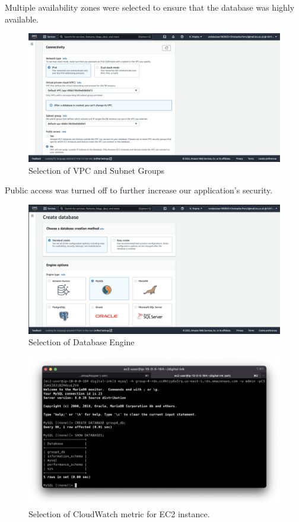 Multiple availability zones were selected to ensure that the database was highly available.

\begin{figure}
    \centering
    \includegraphics[width=\textwidth]{resources/rds/rds-connectivity-1.png}
    \caption{Selection of VPC and Subnet Groups}
    \label{fig:rds-connecting}
\end{figure}

Public access was turned off to further increase our application's security.

\begin{figure}
    \centering
    \includegraphics[width=\textwidth]{resources/rds/rds-create-engine.png}
    \caption{Selection of Database Engine}
    \label{fig:rds-engine}
\end{figure}

\begin{figure}
    \centering
    \includegraphics[width=\textwidth]{resources/rds/rds-database-creation.png}
    \caption{Selection of CloudWatch metric for EC2 instance.}
    \label{fig:rds-db-create}
\end{figure}


